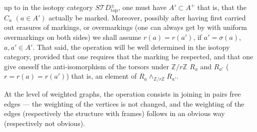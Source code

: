 up to in the isotopy category $S\mathcal TD_{\mathrm{top}}^\pm$, one must
 have $A'\subset A^+$ that is, that the $C_a$ $(a\in A')$ actually be marked.
Moreover, possibly after having first carried out erasures of markings, or overmarkings (one can always get by with uniform overmarkings on both sides) we shall assume $r(a)=r(a')$, if $a'=\sigma(a)$, $a,a'\in A'$.
That said, the operation will be well determined in the isotopy category, provided that one  requires that the marking be respected, and that one give oneself the  anti-isomorphism of the torsors under $\mathbb Z/r\mathbb Z$ $R_a$ and $R_{a'}$ ($r=r(a)=r(a')$) that is, an element of
$R_a\mathbin{\wedge}_{\mathbb Z/r\mathbb Z}R_{a'}$.

At the level of weighted graphs, the operation consists in joining in pairs  free edges --- the weighting of the vertices is not changed, and the weighting of the edges (respectively the structure with frames) follows in an  obvious way (respectively not obvious).
